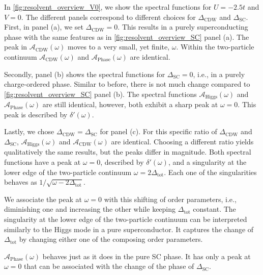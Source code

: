 \documentclass[
    reprint, 
    aps,
    preprintnumbers,
    twocolumn,
    prb,
    superscriptaddress
]{revtex4-2}
\newcommand{\spectral}[1]{\mathcal{A}_\text{#1}  (\omega)}
\begin{document}
In \autoref{fig:resolvent_overview_V0}, we show the spectral functions for $U=-2.5t$ and $V=0$.
The different panels correspond to different choices for $\Delta_\text{CDW}$ and $\Delta_\text{SC}$.
First, in panel (a), we set $\Delta_\text{CDW} = 0$.
This results in a purely superconducting phase with the same features as in \autoref{fig:resolvent_overview_SC} panel (a).
The peak in $\spectral{CDW}$ moves to a very small, yet finite, $\omega$.
Within the two-particle continuum $\spectral{CDW}$ and $\spectral{Phase}$ are identical.

Secondly, panel (b) shows the spectral functions for $\Delta_\text{SC} = 0$, i.e., in a purely charge-ordered phase.
Similar to before, there is not much change compared to \autoref{fig:resolvent_overview_SC} panel (b).
The spectral functions $\spectral{Higgs}$ and $\spectral{Phase}$ are still identical, however, both exhibit a sharp peak at $\omega=0$.
This peak is described by $\delta'(\omega)$.

Lastly, we chose $\Delta_\text{CDW} = \Delta_\text{SC}$ for panel (c).
For this specific ratio of $\Delta_\text{CDW}$ and $\Delta_\text{SC}$, $\spectral{Higgs}$ and $\spectral{CDW}$ are identical.
Choosing a different ratio yields qualitatively the same results, but the peaks differ in magnitude.
Both spectral functions have a peak at $\omega = 0$, described by $\delta'(\omega)$, and a singularity at the lower edge of the two-particle continuum $\omega = 2\Delta_\text{tot}$.
Each one of the singularities behaves as $1/\sqrt{\omega - 2 \Delta_\text{tot}}$.

We associate the peak at $\omega=0$ with this shifting of order parameters, i.e., diminishing one and increasing the other while keeping $\Delta_\text{tot}$ constant.
The singularity at the lower edge of the two-particle continuum can be interpreted similarly to the Higgs mode in a pure superconductor.
It captures the change of $\Delta_\text{tot}$ by changing either one of the composing order parameters.

$\spectral{Phase}$ behaves just as it does in the pure SC phase. It has only a peak at $\omega = 0$ that can be associated with the change of the phase of $\Delta_\text{SC}$.

\end{document}
